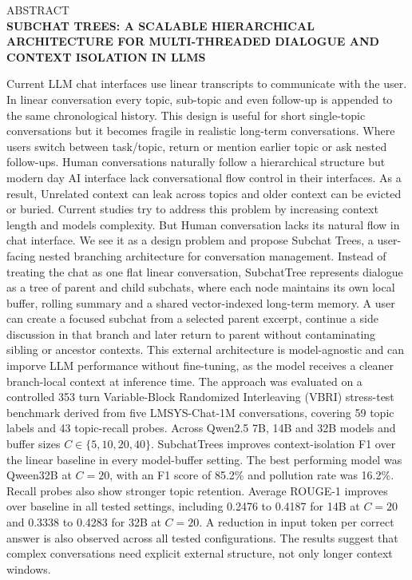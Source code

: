 \begin{center}
{\Large ABSTRACT}\\[24pt]
\textbf{SUBCHAT TREES: A SCALABLE HIERARCHICAL ARCHITECTURE FOR MULTI-THREADED DIALOGUE AND CONTEXT ISOLATION IN LLMS}
\end{center}
\justifying
Current LLM chat interfaces use linear transcripts to communicate with the user. In linear conversation every topic, sub-topic and even follow-up is appended to the same chronological history. This design is useful for short single-topic conversations but it becomes fragile in realistic long-term conversations. Where users switch between task/topic, return or mention earlier topic or ask nested follow-ups. Human conversations naturally follow a hierarchical structure but modern day AI interface lack conversational flow control in their interfaces. As a result, Unrelated context can leak across topics and older context can be evicted or buried. Current studies try to address this problem by increasing context length and models complexity. But Human conversation lacks its natural flow in chat interface. We see it as a design problem and propose Subchat Trees, a user-facing nested branching architecture for conversation management. Instead of treating the chat as one flat linear conversation, SubchatTree represents dialogue as a tree of parent and child subchats, where each node maintains its own local buffer, rolling summary and  a shared vector-indexed long-term memory. A user can create a focused subchat from a selected parent excerpt, continue a side discussion in that branch and later return to parent without contaminating sibling or ancestor contexts. This external architecture is model-agnostic and can imporve LLM performance without fine-tuning, as the model receives a cleaner branch-local context at inference time. The approach was evaluated on a controlled 353 turn Variable-Block Randomized Interleaving (VBRI) stress-test benchmark derived from five LMSYS-Chat-1M conversations, covering 59 topic labels and 43 topic-recall probes. Across Qwen2.5 7B, 14B and 32B models and buffer sizes $C \in \{5,10,20,40\}$. SubchatTrees improves context-isolation F1 over the linear baseline in every model-buffer setting. The best performing model was Qween32B at $C=20$, with an F1 score of 85.2\% and pollution rate was 16.2\%. Recall probes also show stronger topic retention. Average ROUGE-1 improves over baseline in all tested settings, including 0.2476 to 0.4187 for 14B at $C=20$ and 0.3338 to 0.4283 for 32B at $C=20$. A reduction in input token per correct answer is also observed across all tested configurations. The results suggest that complex conversations need explicit external structure, not only longer context windows.
